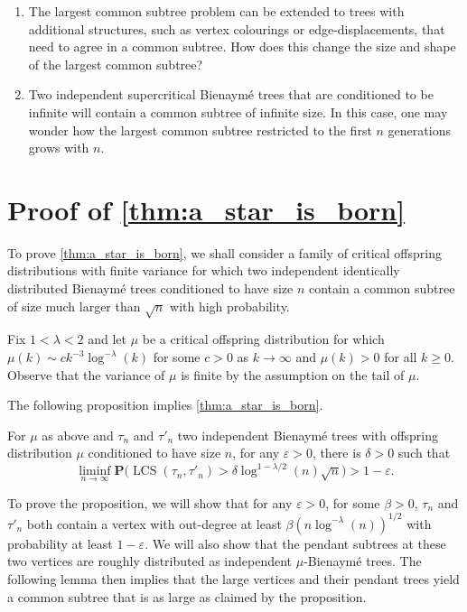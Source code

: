 \documentclass[11pt,reqno]{amsart}
\renewcommand{\P}{\mathbf{P}}
\newcommand{\1}{\mathbf{1}}
\newcommand{\0}{\mathbf{0}}
\newcommand{\LCS}{\operatorname{LCS}}
\begin{document}
\begin{enumerate}
    \item The largest common subtree problem can be extended to trees with additional structures, such as vertex colourings or edge-displacements, that need to agree in a common subtree. How does this change the size and shape of the largest common subtree?
    \item Two independent supercritical Bienaymé trees that are conditioned to be infinite will contain a common subtree of infinite size. In this case, one may wonder how the largest common subtree restricted to the first $n$ generations grows with $n$.  
    
\end{enumerate}


\appendix
\section{Proof of \cref{thm:a_star_is_born}} \label{sec:a_star_is_born}

To prove \cref{thm:a_star_is_born}, we shall consider a family of critical offspring distributions with finite variance for which two independent identically distributed Bienaymé trees conditioned to have size $n$ contain a common subtree of size much larger than $\sqrt{n}$ with high probability.

Fix $1<\lambda<2$ and let $\mu$ be a critical offspring distribution for which $\mu(k)\sim ck^{-3}\log^{-\lambda}(k)$ for some $c>0$ as $k\to \infty$ and $\mu(k)>0$ for all $k\ge 0$. Observe that the variance of $\mu$ is finite by the assumption on the tail of $\mu$. 

The following proposition implies \cref{thm:a_star_is_born}.

\begin{prop}\label{prop:bigstar}
For $\mu$ as above and $\tau_n$ and $\tau'_n$ two independent Bienaymé trees with offspring distribution $\mu$ conditioned to have size $n$, for any $\varepsilon>0$,
there is $\delta>0$ such that
\[\liminf_{n\to\infty} \P\big(\LCS(\tau_n,\tau'_n)>\delta \log^{1-\lambda/2}(n)\sqrt{n}\big)>1-\varepsilon .\]
\end{prop}

To prove the proposition, we will show that for any $\varepsilon>0$, for some $\beta>0$, $\tau_n$ and $\tau'_n$ both contain a vertex with out-degree at least $\beta ({n\log^{-\lambda}(n)})^{1/2}$ with probability at least $1-\varepsilon$. We will also show that the pendant subtrees at these two vertices are roughly distributed as independent $\mu$-Bienaymé trees. The following lemma then implies that the large vertices and their pendant trees yield a common subtree that is as large as claimed by the proposition.
\end{document}
